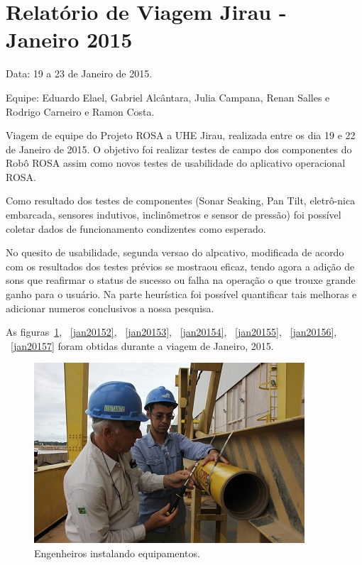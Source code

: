 \section{Relatório de Viagem Jirau - Janeiro 2015}
Data: 19 a 23 de Janeiro de 2015.

Equipe: Eduardo Elael, Gabriel Alcântara, Julia Campana, Renan Salles e Rodrigo Carneiro e Ramon Costa.

Viagem de equipe do Projeto ROSA a UHE Jirau, realizada entre
os dia 19 e 22 de Janeiro de 2015. O objetivo foi realizar testes de campo dos
componentes do Robô ROSA assim como novos testes de usabilidade do aplicativo
operacional ROSA.

Como resultado dos testes de componentes (Sonar Seaking, Pan Tilt, eletrô-\-nica
embarcada, sensores indutivos, inclinômetros e sensor de pressão) foi possível
coletar dados de funcionamento condizentes como esperado.

No quesito de usabilidade, segunda versao do alpcativo, modificada de acordo com
os resultados dos testes prévios se mostraou eficaz, tendo agora a adição de
sons que reafirmar o status de sucesso ou falha na operação o que trouxe grande
ganho para o usuário. Na parte heurística foi possível quantificar tais
melhoras e adicionar numeros conclusivos a nossa pesquisa.

As figuras~\ref{jan20151}, ~\ref{jan20152}, ~\ref{jan20153}, ~\ref{jan20154},
~\ref{jan20155}, ~\ref{jan20156}, ~\ref{jan20157} foram obtidas durante a viagem
de Janeiro, 2015.

\begin{figure}[h!]
\centering
  \includegraphics[width=1\linewidth]{Fotos/Janeiro2015/5.JPG}
  \caption{Engenheiros instalando equipamentos.}
  \label{jan20151}
\end{figure}

